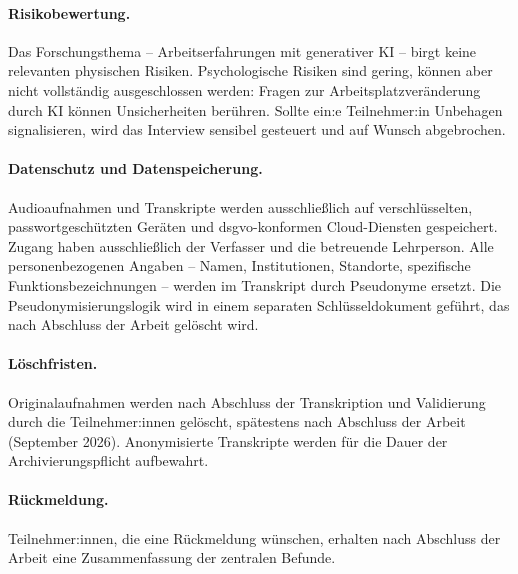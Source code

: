 \paragraph{Risikobewertung.} Das Forschungsthema -- Arbeitserfahrungen mit generativer KI -- birgt keine relevanten physischen Risiken. Psychologische Risiken sind gering, können aber nicht vollständig ausgeschlossen werden: Fragen zur Arbeitsplatzveränderung durch KI können Unsicherheiten berühren. Sollte ein:e Teilnehmer:in Unbehagen signalisieren, wird das Interview sensibel gesteuert und auf Wunsch abgebrochen.

\paragraph{Datenschutz und Datenspeicherung.} Audioaufnahmen und Transkripte werden ausschließlich auf verschlüsselten, passwortgeschützten Geräten und \acrshort{dsgvo}-konformen Cloud-Diensten gespeichert. Zugang haben ausschließlich der Verfasser und die betreuende Lehrperson. Alle personenbezogenen Angaben -- Namen, Institutionen, Standorte, spezifische Funktionsbezeichnungen -- werden im Transkript durch Pseudonyme ersetzt. Die Pseudonymisierungslogik wird in einem separaten Schlüsseldokument geführt, das nach Abschluss der Arbeit gelöscht wird.

\paragraph{Löschfristen.} Originalaufnahmen werden nach Abschluss der Transkription und Validierung durch die Teilnehmer:innen gelöscht, spätestens nach Abschluss der Arbeit (September 2026). Anonymisierte Transkripte werden für die Dauer der Archivierungspflicht aufbewahrt.

\paragraph{Rückmeldung.} Teilnehmer:innen, die eine Rückmeldung wünschen, erhalten nach Abschluss der Arbeit eine Zusammenfassung der zentralen Befunde.